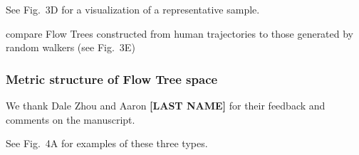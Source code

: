 
See Fig.~3D for a visualization of a representative sample.


compare Flow Trees constructed from human trajectories to those generated
by random walkers (see Fig.~3E)


\subsubsection*{Metric structure of Flow Tree space}


We thank Dale Zhou and Aaron \textbf{[LAST NAME]} for their feedback and
comments on the manuscript.


See Fig.~4A for examples of these three types.

